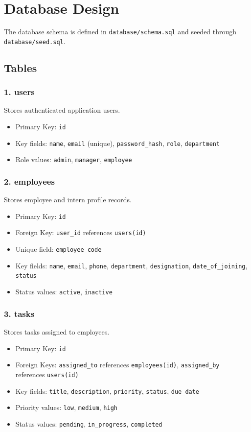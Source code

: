 \chapter{Database Design}

The database schema is defined in \texttt{database/schema.sql} and seeded through \texttt{database/seed.sql}.

\section{Tables}
\subsection*{1. users}
Stores authenticated application users.
\begin{itemize}[leftmargin=1.3cm]
\item Primary Key: \texttt{id}
\item Key fields: \texttt{name}, \texttt{email} (unique), \texttt{password\_hash}, \texttt{role}, \texttt{department}
\item Role values: \texttt{admin}, \texttt{manager}, \texttt{employee}
\end{itemize}

\subsection*{2. employees}
Stores employee and intern profile records.
\begin{itemize}[leftmargin=1.3cm]
\item Primary Key: \texttt{id}
\item Foreign Key: \texttt{user\_id} references \texttt{users(id)}
\item Unique field: \texttt{employee\_code}
\item Key fields: \texttt{name}, \texttt{email}, \texttt{phone}, \texttt{department}, \texttt{designation}, \texttt{date\_of\_joining}, \texttt{status}
\item Status values: \texttt{active}, \texttt{inactive}
\end{itemize}

\subsection*{3. tasks}
Stores tasks assigned to employees.
\begin{itemize}[leftmargin=1.3cm]
\item Primary Key: \texttt{id}
\item Foreign Keys: \texttt{assigned\_to} references \texttt{employees(id)}, \texttt{assigned\_by} references \texttt{users(id)}
\item Key fields: \texttt{title}, \texttt{description}, \texttt{priority}, \texttt{status}, \texttt{due\_date}
\item Priority values: \texttt{low}, \texttt{medium}, \texttt{high}
\item Status values: \texttt{pending}, \texttt{in\_progress}, \texttt{completed}
\end{itemize}

